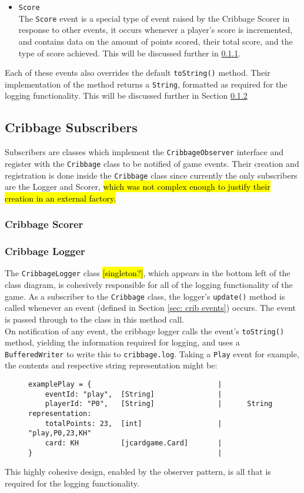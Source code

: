 \documentclass{article}
\begin{document}
\begin{itemize}
    \item \verb|Score|\\[2mm]
    The \verb|Score| event is a special type of event raised by the Cribbage Scorer in response to other events, it occurs whenever a player's score is incremented, and contains data on the amount of points scored, their total score, and the type of score achieved. This will be discussed further in \ref{sec: crib scorer}.
\end{itemize}
Each of these events also overrides the default \verb|toString()| method. Their implementation of the method returns a \verb|String|, formatted as required for the logging functionality. This will be discussed further in Section \ref{sec: crib logger}


\subsection{Cribbage Subscribers}
\label{sec: crib subscribers}
Subscribers are classes which implement the \verb|CribbageObserver| interface and register with the \verb|Cribbage| class to be notified of game events. Their creation and registration is done inside the \verb|Cribbage| class since currently the only subscribers are the Logger and Scorer, \hl{which was not complex enough to justify their creation in an external factory.}
\subsubsection{Cribbage Scorer}
\label{sec: crib scorer}
\subsubsection{Cribbage Logger}
\label{sec: crib logger}
The \verb|CribbageLogger| class \hl{[singleton?]}, which appears in the bottom left of the class diagram, is cohesively responsible for all of the logging functionality of the game. As a subscriber to the \verb|Cribbage| class, the logger's \verb|update()| method is called whenever an event (defined in Section \ref{sec: crib events}) occurs. The event is passed through to the class in this method call.\\[2mm]
On notification of any event, the cribbage logger calls the event's \verb|toString()| method, yielding the information required for logging, and uses a \verb|BufferedWriter| to write this to \verb|cribbage.log|. Taking a \verb|Play| event for example, the contents and respective string representation might be:
\begin{figure}[H]
\centering
\begin{BVerbatim}
examplePlay = {                              |
    eventId: "play",  [String]               |
    playerId: "P0",   [String]               |      String representation:
    totalPoints: 23,  [int]                  |      "play,P0,23,KH"
    card: KH          [jcardgame.Card]       |  
}                                            |
\end{BVerbatim}
\end{figure}
\noindent This highly cohesive design, enabled by the observer pattern, is all that is required for the logging functionality.
\end{document}
